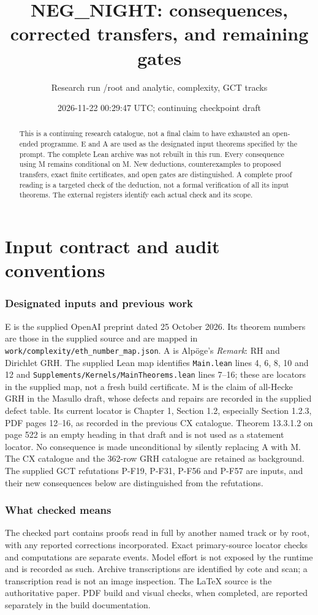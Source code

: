 \documentclass[11pt]{article}
\title{NEG\_NIGHT: consequences, corrected transfers, and remaining gates}
\author{Research run /root and analytic, complexity, GCT tracks}
\date{2026-11-22 00:29:47 UTC; continuing checkpoint draft}
\theoremstyle{definition}
\begin{document}
\maketitle
\begin{abstract}
This is a continuing research catalogue, not a final claim to have exhausted
an open-ended programme. E and A are used as the designated input theorems
specified by the prompt. The complete Lean archive was not rebuilt in this
run. Every consequence using M remains conditional on M. New deductions,
counterexamples to proposed transfers, exact finite certificates, and open
gates are distinguished. A complete proof reading is a targeted check of the
deduction, not a formal verification of all its input theorems. The external
registers identify each actual check and its scope.
\end{abstract}
\tableofcontents
\part{Input contract and audit conventions}
\section{Designated inputs and previous work}
E is the supplied OpenAI preprint dated 25 October 2026. Its theorem numbers
are those in the supplied source and are mapped in
\texttt{work/complexity/eth\_number\_map.json}. A is Alp\"oge's
\emph{Remark}: RH and Dirichlet GRH. The supplied Lean map identifies
\texttt{Main.lean} lines 4, 6, 8, 10 and 12 and
\texttt{Supplements/Kernels/MainTheorems.lean} lines 7--16;
these are locators in the supplied map, not a fresh build certificate.
M is the claim of all-Hecke GRH in the Masullo draft, whose defects and
repairs are recorded in the supplied defect table. Its current locator is
Chapter 1, Section 1.2, especially Section 1.2.3, PDF pages 12--16,
as recorded in the previous CX catalogue. Theorem 13.3.1.2 on page 522
is an empty heading in that draft and is not used as a statement locator.
No consequence is made
unconditional by silently replacing A with M.
The CX catalogue and the 362-row GRH catalogue are retained as background.
The supplied GCT refutations P-F19, P-F31, P-F56 and P-F57 are inputs,
and their new consequences below are distinguished from the refutations.
\section{What checked means}
The checked part contains proofs read in full by another named track or by
root, with any reported corrections incorporated. Exact primary-source
locator checks and computations are separate events. Model effort is not
exposed by the runtime and is recorded as such. Archive transcriptions are
identified by cote and scan; a transcription read is not an image inspection.
The LaTeX source is the authoritative paper. PDF build and visual checks,
when completed, are reported separately in the build documentation.
\end{document}
